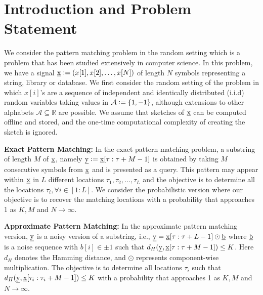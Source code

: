 \section{Introduction and Problem Statement}
\label{sec:introduction}
We consider the pattern matching problem in the random setting which is a problem that has been studied extensively in computer science. In this problem, we have a signal $\underline{\mathrm{x}} \mathrel{\mathop:}= (x[1], x[2],\ldots, x[N])$ of length $N$ symbols representing a string, library or database. We first consider the random setting of the problem in which $x[i]$'s are a sequence of independent and identically distributed (i.i.d) random variables taking values in $\mathcal{A} \mathrel{\mathop:}= \{1,-1\}$, although extensions to other alphabets $\mathcal{A} \subseteq \mathbb{R}$ are possible. We assume that sketches of $\underline{\mathrm{x}}$ can be computed offline and stored, and the one-time computational complexity of creating the sketch is ignored.

{\bf Exact Pattern Matching:} In the exact pattern matching problem, a substring of length $M$ of $\underline{\mathrm{x}}$, namely $\underline{\mathrm{y}} \mathrel{\mathop:}= \underline{\mathrm{x}}[\tau:\tau+M-1]$ is obtained by taking $M$ consecutive symbols from $\underline{\mathrm{x}}$ and is presented as a query. This pattern may appear within $\underline{\mathrm{x}}$ in $L$ different locations $\tau_1,\tau_2,\ldots,\tau_L$ and the objective is to determine all the locations $\tau_i, \forall i\in[1:L]$. We consider the probabilistic version where our objective is to recover the matching locations with a probability that approaches 1 as $K, M$ and $N \rightarrow \infty$.

{\bf Approximate Pattern Matching:} In the approximate pattern matching version, $\underline{\mathrm{y}}$ is a noisy version of a substring, i.e., $\underline{\mathrm{y}} = \underline{\mathrm{x}}[\tau:\tau+L-1] \odot \underline{\mathrm{b}}$ where $\underline{\mathrm{b}}$ is a noise sequence with $b[i] \in \pm 1$ such that $d_H(\underline{\mathrm{y}},\underline{\mathrm{x}}[\tau:\tau+M-1]) \leq K$. Here $d_H$ denotes the Hamming distance, and $\odot$ represents component-wise multiplication. The objective is to determine all locations $\tau_i$ such that $d_H(\underline{\mathrm{y}},\underline{\mathrm{x}}[\tau_i:\tau_i+M-1]) \leq K$ with a probability that approaches 1 as $K, M$ and $N \rightarrow \infty$.


